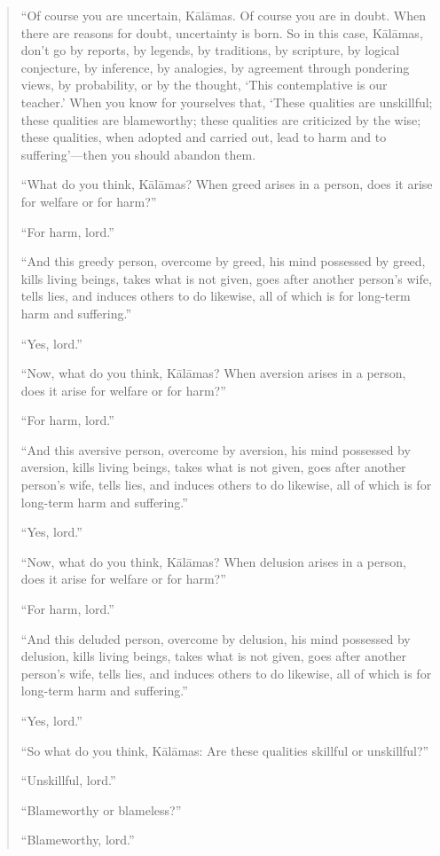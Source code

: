 \begin{quotation}
“Of course you are uncertain, Kālāmas. Of course you are in doubt. When
there are reasons for doubt, uncertainty is born. So in this case,
Kālāmas, don’t go by reports, by legends, by traditions, by scripture,
by logical conjecture, by inference, by analogies, by agreement through
pondering views, by probability, or by the thought, ‘This contemplative
is our teacher.’ When you know for yourselves that, ‘These qualities are
unskillful; these qualities are blameworthy; these qualities are
criticized by the wise; these qualities, when adopted and carried out,
lead to harm and to suffering’—then you should abandon them.

“What do you think, Kālāmas? When greed arises in a person, does it
arise for welfare or for harm?”

“For harm, lord.”

“And this greedy person, overcome by greed, his mind possessed by greed,
kills living beings, takes what is not given, goes after another
person’s wife, tells lies, and induces others to do likewise, all of
which is for long-term harm and suffering.”

“Yes, lord.”

“Now, what do you think, Kālāmas? When aversion arises in a person, does
it arise for welfare or for harm?”

“For harm, lord.”

“And this aversive person, overcome by aversion, his mind possessed by
aversion, kills living beings, takes what is not given, goes after
another person’s wife, tells lies, and induces others to do likewise,
all of which is for long-term harm and suffering.”

“Yes, lord.”

“Now, what do you think, Kālāmas? When delusion arises in a person, does
it arise for welfare or for harm?”

“For harm, lord.”

“And this deluded person, overcome by delusion, his mind possessed by
delusion, kills living beings, takes what is not given, goes after
another person’s wife, tells lies, and induces others to do likewise,
all of which is for long-term harm and suffering.”

“Yes, lord.”

“So what do you think, Kālāmas: Are these qualities skillful or
unskillful?”

“Unskillful, lord.”

“Blameworthy or blameless?”

“Blameworthy, lord.”


\end{quotation}
